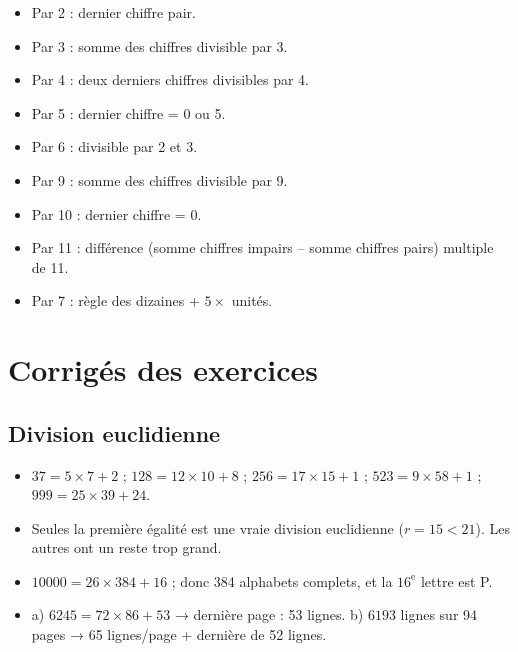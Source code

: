 \documentclass[12pt,a4paper]{article}
\begin{document}
\begin{itemize}
    \item Par 2 : dernier chiffre pair.
    \item Par 3 : somme des chiffres divisible par 3.
    \item Par 4 : deux derniers chiffres divisibles par 4.
    \item Par 5 : dernier chiffre = 0 ou 5.
    \item Par 6 : divisible par 2 et 3.
    \item Par 9 : somme des chiffres divisible par 9.
    \item Par 10 : dernier chiffre = 0.
    \item Par 11 : différence (somme chiffres impairs – somme chiffres pairs) multiple de 11.
    \item Par 7 : règle des dizaines + $5 \times$ unités.
\end{itemize}

\newpage
\section*{Corrigés des exercices}

\subsection*{Division euclidienne}
\begin{itemize}
    \item $37 = 5 \times 7 + 2$ ;  
    $128 = 12 \times 10 + 8$ ;  
    $256 = 17 \times 15 + 1$ ;  
    $523 = 9 \times 58 + 1$ ;  
    $999 = 25 \times 39 + 24$.
    \item Seules la première égalité est une vraie division euclidienne ($r=15<21$). Les autres ont un reste trop grand.
    \item $10000 = 26 \times 384 + 16$ ; donc 384 alphabets complets, et la $16^\text{e}$ lettre est P.
    \item a) $6245 = 72 \times 86 + 53$ → dernière page : 53 lignes.  
          b) $6193$ lignes sur 94 pages → 65 lignes/page + dernière de 52 lignes.
\end{itemize}
\end{document}
